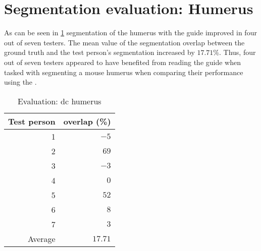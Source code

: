 \section{Segmentation evaluation: Humerus}\label{s:seg-eval-humerus}
As can be seen in \cref{tab:humerus-overlap} segmentation of the humerus with the guide improved in four out of seven testers.
The mean value of the segmentation overlap between the ground truth and the test person's segmentation increased by $17.71\%$.
Thus, four out of seven testers appeared to have benefited from reading the guide when tasked with segmenting a mouse
humerus when comparing their performance using the .
\begin{table}[ht]
	\begin{center}
		\begin{tabular}{r r}
			\textbf{Test person} & \textbf{overlap (\%)} \\
			\hline
			1                    & $-5$                  \\
			2                    & $69$                  \\
			3                    & $-3$                  \\
			4                    & $0$                   \\
			5                    & $52$                  \\
			6                    & $8$                   \\
			7                    & $3$                   \\
			\hline
			Average              & $17.71$               \\
		\end{tabular}
		\caption{Evaluation: \acrshort{dc} humerus}\label{tab:humerus-overlap}
	\end{center}
\end{table}

